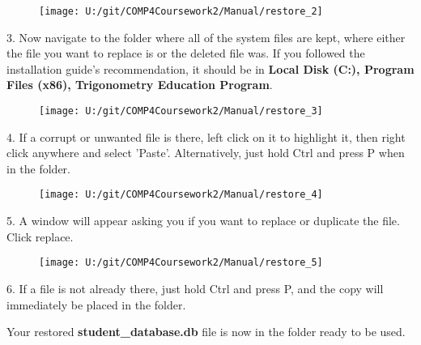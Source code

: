 \begin{figure}[H]
    \texttt{[image: U:/git/COMP4Coursework2/Manual/restore\_2]}
\end{figure}

3. Now navigate to the folder where all of the system files are kept, where either the file you want to replace is or the deleted file was. If you followed the installation guide's recommendation, it should be in \textbf{Local Disk (C:), Program Files (x86), Trigonometry Education Program}.

\begin{figure}[H]
    \texttt{[image: U:/git/COMP4Coursework2/Manual/restore\_3]}
\end{figure}

4. If a corrupt or unwanted file is there, left click on it to highlight it, then right click anywhere and select 'Paste'.  Alternatively, just hold Ctrl and press P when in the folder.

\begin{figure}[H]
    \texttt{[image: U:/git/COMP4Coursework2/Manual/restore\_4]}
\end{figure}

5. A window will appear asking you if you want to replace or duplicate the file. Click replace.

\begin{figure}[H]
    \texttt{[image: U:/git/COMP4Coursework2/Manual/restore\_5]}
\end{figure}

6. If a file is not already there, just hold Ctrl and press P, and the copy will immediately be placed in the folder.

Your restored \textbf{student\_database.db} file is now in the folder ready to be used.